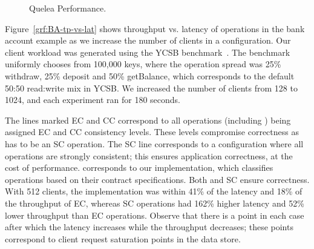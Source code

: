 \begin{figure}
  \centering
	\caption{Quelea Performance.}
  \label{grf:LWW_perf}
\end{figure}

Figure~\ref{grf:BA-tp-vs-lat} shows throughput vs. latency of operations
in the bank account example as we increase the number of clients in a 
configuration. Our client workload was generated using the YCSB
benchmark~\cite{YCSB}. The benchmark uniformly chooses from 100,000 keys, where
the operation spread was 25\% withdraw, 25\% deposit and 50\% getBalance, which
corresponds to the default 50:50 read:write mix in YCSB. We increased the
number of clients from 128 to 1024, and each experiment ran for 180 seconds.

The lines marked EC and CC correspond to all operations (including
) being assigned EC and CC consistency levels. These levels
compromise correctness as  has to be an SC operation. The SC
line corresponds to a configuration where all operations are strongly
consistent; this ensures application correctness, at the cost of
performance. \name corresponds to our implementation, which classifies
operations based on their contract specifications.  Both \name and SC ensure
correctness. With 512 clients, the \name implementation was within 41\% of
the latency and 18\% of the throughput of EC, whereas SC operations had
162\% higher latency and 52\% lower throughput than EC operations. Observe
that there is a point in each case after which the latency increases while
the throughput decreases; these points correspond to client request
saturation points in the data store.

